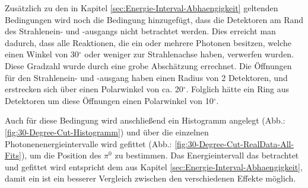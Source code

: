 \documentclass[a4paper,11pt,oneside,final,german,openbib,pdftex]{scrbook}
\begin{document}
{%


Zus\"atzlich zu den in Kapitel \ref{sec:Energie-Interval-Abhaengigkeit} geltenden Bedingungen wird noch die Bedingung hinzugef\"ugt, dass die Detektoren am Rand des Strahlenein- und -ausgangs nicht betrachtet werden. Dies erreicht man dadurch, dass alle Reaktionen, die ein oder mehrere Photonen besitzen, welche einen Winkel von 30$^{\circ}$ oder weniger zur Strahlenachse haben, verwerfen wurden. Diese Gradzahl wurde durch eine grobe Absch\"atzung errechnet. Die \"Offnungen f\"ur den Strahlenein- und -ausgang haben einen Radius von 2 Detektoren, und erstrecken sich \"uber einen Polarwinkel von ca. 20$^{\circ}$. Folglich h\"atte ein Ring aus Detektoren um diese \"Offnungen einen Polarwinkel von 10$^{\circ}$. 
 
Auch f\"ur diese Bedingung wird anschlie{\ss}end ein Histogramm angelegt (Abb.: \ref{fig:30-Degree-Cut-Histogramm}) und über die einzelnen Photonenenergieintervalle wird gefittet (Abb.: \ref{fig:30-Degree-Cut-RealData-All-Fits}), um die Position des $\pi^0$ zu bestimmen. Das Energieintervall das betrachtet und gefittet wird entspricht dem aus Kapitel \ref{sec:Energie-Interval-Abhaengigkeit}, damit ein ist ein besserer Vergleich zwischen den verschiedenen Effekte m\"oglich.

}
\end{document}
